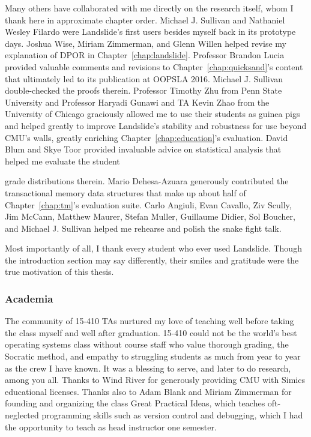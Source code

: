 \documentclass[12pt]{cmuthesis}
\begin{document}
\begin{acknowledgments}
{{Many others have collaborated with me directly on the research itself,
whom I thank here in approximate chapter order.
Michael J. Sullivan and Nathaniel Wesley Filardo were Landslide's first users besides myself back in its prototype days.
Joshua Wise, Miriam Zimmerman, and Glenn Willen helped revise my explanation of DPOR in Chapter~\ref{chap:landslide}.
Professor Brandon Lucia provided valuable comments and revisions to Chapter~\ref{chap:quicksand}'s content
that ultimately led to its publication at OOPSLA 2016.
Michael J. Sullivan double-checked the proofs therein.
Professor Timothy Zhu from Penn State University
and Professor Haryadi Gunawi and TA Kevin Zhao from the University of Chicago
graciously allowed me to use their students as guinea pigs
and helped greatly to improve Landslide's stability and robustness for use beyond CMU's walls,
greatly enriching Chapter~\ref{chap:education}'s evaluation.
David Blum and Skye Toor provided
invaluable advice on statistical analysis
that helped me evaluate the student
\unskip\parfillskip 0pt \par}

\pagebreak

\noindent
grade distributions therein.
Mario Dehesa-Azuara generously contributed the
transactional memory data structures
that make up about half of Chapter~\ref{chap:tm}'s evaluation suite.
%
Carlo Angiuli, Evan Cavallo, Ziv Scully, Jim McCann,
Matthew Maurer, Stefan Muller, Guillaume Didier,
Sol Boucher, and Michael J. Sullivan
helped me rehearse and polish the snake fight talk.

Most importantly of all, I thank every student who ever used Landslide.
Though the introduction section may say differently,
their smiles and gratitude were the true motivation of this thesis.

\subsubsection{Academia}

The community of 15-410 TAs
nurtured my love of teaching
well before taking the class myself and well after graduation.
15-410 could not be the world's best operating systems class
without %
course staff %
who value thorough grading, the Socratic method,
and empathy to struggling students as much
from year to year as the crew I have known.
It was a blessing to serve, and later to do research, among you all.
Thanks to Wind River for generously
providing CMU with Simics educational licenses.
Thanks also to Adam Blank and Miriam Zimmerman
for founding and organizing the class Great Practical Ideas,
which teaches oft-neglected programming skills such as version control and debugging,
which I had the opportunity to teach as head instructor one semester.

}
\end{acknowledgments}
\end{document}
